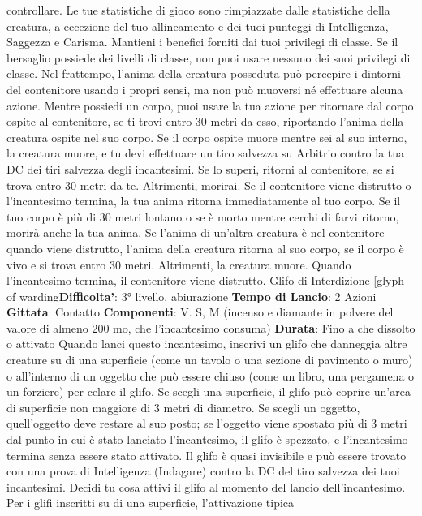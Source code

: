 \begin{multicols}{2}
controllare. Le tue statistiche di gioco sono rimpiazzate
dalle statistiche della creatura, a eccezione del tuo
allineamento e dei tuoi punteggi di Intelligenza,
Saggezza e Carisma. Mantieni i benefici forniti dai tuoi
privilegi di classe. Se il bersaglio possiede dei livelli di
classe, non puoi usare nessuno dei suoi privilegi di
classe.
Nel frattempo, l’anima della creatura posseduta può
percepire i dintorni del contenitore usando i propri
sensi, ma non può muoversi né effettuare alcuna
azione.
Mentre possiedi un corpo, puoi usare la tua azione per
ritornare dal corpo ospite al contenitore, se ti trovi entro
30 metri da esso, riportando l’anima della creatura
ospite nel suo corpo. Se il corpo ospite muore mentre
sei al suo interno, la creatura muore, e tu devi effettuare
un tiro salvezza su Arbitrio contro la tua DC dei tiri
salvezza degli incantesimi. Se lo superi, ritorni al
contenitore, se si trova entro 30 metri da te. Altrimenti,
morirai.
Se il contenitore viene distrutto o l’incantesimo termina,
la tua anima ritorna immediatamente al tuo corpo. Se il
tuo corpo è più di 30 metri lontano o se è morto mentre
cerchi di farvi ritorno, morirà anche la tua anima. Se
l’anima di un’altra creatura è nel contenitore quando
viene distrutto, l’anima della creatura ritorna al suo
corpo, se il corpo è vivo e si trova entro 30 metri.
Altrimenti, la creatura muore.
Quando l’incantesimo termina, il contenitore viene
distrutto.
Glifo di Interdizione
[glyph of warding\textbf{Difficolta'}:
3° livello, abiurazione
\textbf{Tempo di Lancio}: 2 Azioni
\textbf{Gittata}: Contatto
\textbf{Componenti}: V. S, M (incenso e diamante in polvere
del valore di almeno 200 mo, che l’incantesimo
consuma)
\textbf{Durata}: Fino a che dissolto o attivato
Quando lanci questo incantesimo, inscrivi un glifo che
danneggia altre creature su di una superficie (come un
tavolo o una sezione di pavimento o muro) o all’interno
di un oggetto che può essere chiuso (come un libro,
una pergamena o un forziere) per celare il glifo. Se
scegli una superficie, il glifo può coprire un’area di
superficie non maggiore di 3 metri di diametro. Se
scegli un oggetto, quell’oggetto deve restare al suo
posto; se l’oggetto viene spostato più di 3 metri dal
punto in cui è stato lanciato l’incantesimo, il glifo è
spezzato, e l’incantesimo termina senza essere stato
attivato.
Il glifo è quasi invisibile e può essere trovato con una
prova di Intelligenza (Indagare) contro la DC del tiro
salvezza dei tuoi incantesimi.
Decidi tu cosa attivi il glifo al momento del lancio
dell’incantesimo.
Per i glifi inscritti su di una superficie, l’attivazione tipica

\end{multicols}
